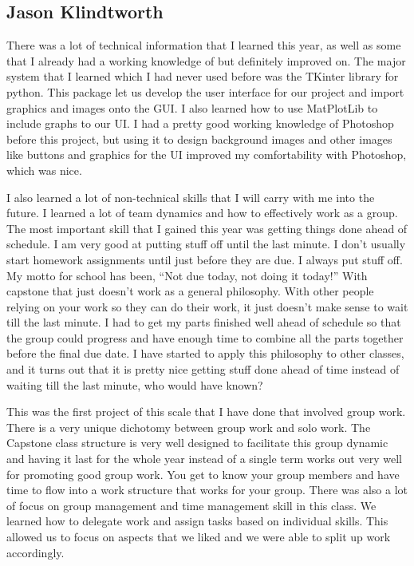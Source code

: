 \documentclass[10pt,draftclsnofoot,onecolumn,retainorgcmds]{IEEEtran}
\begin{document}
\subsection{Jason Klindtworth}
There was a lot of technical information that I learned this year, as well as some that I already had a working knowledge of but definitely improved on. The major system that I learned which I had never used before was the TKinter library for python. This package let us develop the user interface for our project and import graphics and images onto the GUI. I also learned how to use MatPlotLib to include graphs to our UI. I had a pretty good working knowledge of Photoshop before this project, but using it to design background images and other images like buttons and graphics for the UI improved my comfortability with Photoshop, which was nice. \par
I also learned a lot of non-technical skills that I will carry with me into the future. I learned a lot of team dynamics and how to effectively work as a group. The most important skill that I gained this year was getting things done ahead of schedule. I am very good at putting stuff off until the last minute. I don’t usually start homework assignments until just before they are due. I always put stuff off. My motto for school has been, “Not due today, not doing it today!” With capstone that just doesn’t work as a general philosophy. With other people relying on your work so they can do their work, it just doesn’t make sense to wait till the last minute. I had to get my parts finished well ahead of schedule so that the group could progress and have enough time to combine all the parts together before the final due date. I have started to apply this philosophy to other classes, and it turns out that it is pretty nice getting stuff done ahead of time instead of waiting till the last minute, who would have known?\par
This was the first project of this scale that I have done that involved group work. There is a very unique dichotomy between group work and solo work. The Capstone class structure is very well designed to facilitate this group dynamic and having it last for the whole year instead of a single term works out very well for promoting good group work. You get to know your group members and have time to flow into a work structure that works for your group. There was also a lot of focus on group management and time management skill in this class. We learned how to delegate work and assign tasks based on individual skills. This allowed us to focus on aspects that we liked and we were able to split up work accordingly.\par
\end{document}
